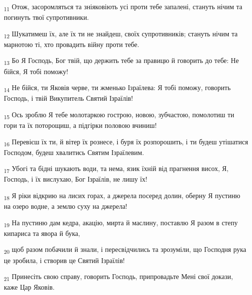 \begin{tcolorbox}
\textsubscript{11} Отож, засоромляться та зніяковіють усі проти тебе запалені, стануть нічим та погинуть твої супротивники.
\end{tcolorbox}
\begin{tcolorbox}
\textsubscript{12} Шукатимеш їх, але їх ти не знайдеш, своїх супротивників; стануть нічим та марнотою ті, хто провадить війну проти тебе.
\end{tcolorbox}
\begin{tcolorbox}
\textsubscript{13} Бо Я Господь, Бог твій, що держить тебе за правицю й говорить до тебе: Не бійся, Я тобі поможу!
\end{tcolorbox}
\begin{tcolorbox}
\textsubscript{14} Не бійся, ти Яковів черве, ти жменько Ізраїлева: Я тобі поможу, говорить Господь, і твій Викупитель Святий Ізраїлів!
\end{tcolorbox}
\begin{tcolorbox}
\textsubscript{15} Ось зроблю Я тебе молотаркою гострою, новою, зубчастою, помолотиш ти гори та їх поторощиш, а підгірки половою вчиниш!
\end{tcolorbox}
\begin{tcolorbox}
\textsubscript{16} Перевієш їх ти, й вітер їх рознесе, і буря їх розпорошить, і ти будеш утішатися Господом, будеш хвалитись Святим Ізраїлевим.
\end{tcolorbox}
\begin{tcolorbox}
\textsubscript{17} Убогі та бідні шукають води, та нема, язик їхній від прагнення висох, Я, Господь, і їх вислухаю, Бог Ізраїлів, не лишу їх!
\end{tcolorbox}
\begin{tcolorbox}
\textsubscript{18} Я ріки відкрию на лисих горах, а джерела посеред долин, оберну Я пустиню на озеро водне, а землю суху на джерела!
\end{tcolorbox}
\begin{tcolorbox}
\textsubscript{19} На пустиню дам кедра, акацію, мирта й маслину, поставлю Я разом в степу кипариса та явора й бука,
\end{tcolorbox}
\begin{tcolorbox}
\textsubscript{20} щоб разом побачили й знали, і пересвідчились та зрозуміли, що Господня рука це зробила, і створив це Святий Ізраїлів!
\end{tcolorbox}
\begin{tcolorbox}
\textsubscript{21} Принесіть свою справу, говорить Господь, припровадьте Мені свої докази, каже Цар Яковів.
\end{tcolorbox}
